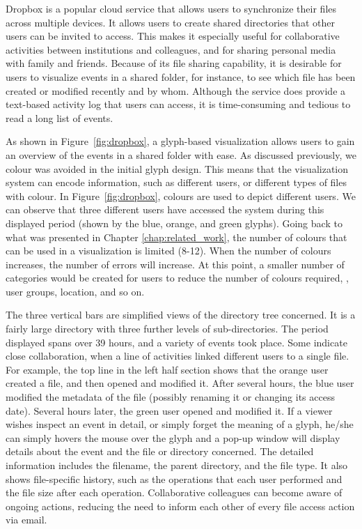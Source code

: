 %
Dropbox is a popular cloud service that allows users to synchronize their files across multiple devices.
It allows users to create shared directories that other users can be invited to access.
This makes it especially useful for collaborative activities between institutions and colleagues, and for sharing personal media with family and friends.
Because of its file sharing capability, it is desirable for users to visualize events in a shared folder, for instance, to see which file has been created or modified recently and by whom.
Although the service does provide a text-based activity log that users can access, it is time-consuming and tedious to read a long list of events.


As shown in Figure~\ref{fig:dropbox}, a glyph-based visualization allows users to gain an overview of the events in a shared folder with ease.
As discussed previously, we colour was avoided in the initial glyph design.
This means that the visualization system can encode information, such as different users, or different types of files with colour.
In Figure~\ref{fig:dropbox}, colours are used to depict different users.
We can observe that three different users have accessed the system during this displayed period (shown by the blue, orange, and green glyphs).
Going back to what was presented in Chapter \ref{chap:related_work}, the number of colours that can be used in a visualization is limited (8-12).
When the number of colours increases, the number of errors will increase.
At this point, a smaller number of categories would be created for users to reduce the number of colours required, \eg, user groups, location, and so on.

The three vertical bars are simplified views of the directory tree concerned.
It is a fairly large directory with three further levels of sub-directories.
The period displayed spans over 39 hours, and a variety of events took place.
Some indicate close collaboration, when a line of activities linked different users to a single file.
For example, the top line in the left half section shows that the orange user created a file, and then opened and modified it.
After several hours, the blue user modified the metadata of the file (possibly renaming it or changing its access date).
Several hours later, the green user opened and modified it.
If a viewer wishes inspect an event in detail, or simply forget the meaning of a glyph, he/she can simply hovers the mouse over the glyph and a pop-up window will display details about the event and the file or directory concerned.
The detailed information includes the filename, the parent directory, and the file type.
It also shows file-specific history, such as the operations that each user performed and the file size after each operation.
Collaborative colleagues can become aware of ongoing actions, reducing the need to inform each other of every file access action via email.


